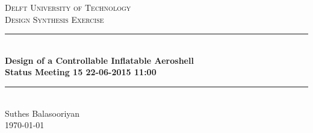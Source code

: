 \documentclass[12pt]{report}
\newcommand{\HRule}{\rule{\linewidth}{0.04cm}}
\begin{document}
\clearpage
\thispagestyle{empty}

\begin{center}

\textsc{\LARGE Delft University of Technology}\\[0.3cm]
\textsc{\Large Design Synthesis Exercise}\\[0.5cm]

\HRule \\[0.4cm]
{\Large \bfseries Design of a Controllable Inflatable Aeroshell}\\[0.2cm]
{\Huge \bfseries Status Meeting 15 22-06-2015 11:00}\\[0.2cm]
\HRule \\[1.2cm]

\vspace{10mm}
Suthes Balasooriyan
\\
\today
\\


\end{center}



\newpage

\end{document}
